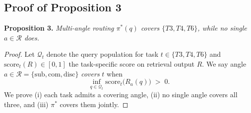 \documentclass{article}
\begin{document}
\subsection{Proof of Proposition 3}\label{proof3}
\textbf{Proposition 3.} \textit{Multi-angle routing $\pi^{*}(q)$ covers $\{T3,T4,T6\}$, while no single $a\!\in\!\mathcal{R}$ does.}\vspace{-2mm}
\begin{proof}
Let $\mathcal{Q}_t$ denote the query population for task $t\!\in\!\{T3,T4,T6\}$ and $\mathrm{score}_t(R)\!\in\![0,1]$ the task-specific score on retrieval output $R$. We say angle $a\!\in\!\mathcal{R}\!=\!\{\mathrm{sub},\mathrm{com},\mathrm{disc}\}$ \emph{covers} $t$ when
\begin{equation}
\inf_{q\in\mathcal{Q}_t}\mathrm{score}_t\!\bigl(R_a(q)\bigr)\;>\;0.
\label{eq:p3-cover}
\end{equation}
We prove (i) each task admits a covering angle, (ii) no single angle covers all three, and (iii) $\pi^{*}$ covers them jointly.


\end{proof}
\end{document}
